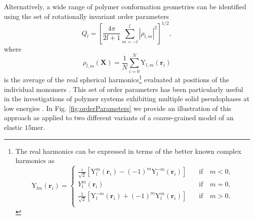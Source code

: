 \documentclass[12pt]{report}
\begin{document}
Alternatively, a wide range of polymer conformation geometries can be identified using the set of rotationally invariant order parameters
%
\begin{equation}
Q_{l} = \left[ \frac{4\pi}{2l + 1} \displaystyle\sum_{m = -l}^{l}
|\rho_{l,m}|^{2} \right]^{1/2},	
\end{equation}
%
where 
\begin{equation}
\rho _{l,m}(\mathbf{X}) = \frac{1}{N}\sum _{i = 0} ^{N} \mathrm{Y}_{l,m}(\mathbf{r}_{i})
\label{eq:15}
\end{equation}
%
is the average of the real spherical harmonics\footnote{The real harmonics can be expressed in terms of the better known complex harmonics as
\begin{equation}
	\mathrm{Y}_{lm}(\mathbf{r}_{i}) =  \left\{
		\begin{array}{lr}
		\frac{i}{\sqrt{2}}\left[\mathrm{Y}_{l}^{m}(\mathbf{r}_{i}) -
(-1)^{m}\mathrm{Y}_{l}^{-m}(\mathbf{r}_{i})\right] & \quad \mathrm{if} \quad  m < 0,
\\[1.5ex]
		{Y}_{l}^{m}(\mathbf{r}_{i}) & \quad \mathrm{if} \quad  m = 0, \\[1.5ex]
		\frac{1}{\sqrt{2}}\left[\mathrm{Y}_{l}^{-m}(\mathbf{r}_{i}) +
(-1)^{m}\mathrm{Y}_{l}^{m}(\mathbf{r}_{i})\right] & \quad \mathrm{if} \quad  m > 0. \\
		\end{array}
	\right. 
\end{equation}
} evaluated at positions of the individual monomers \cite{Neirotti2000}. This set of order parameters has been particularly useful in the investigations of polymer systems exhibiting multiple solid pseudophases at low energies \cite{Koci2016}. In Fig.\,\,\ref{fig:orderParameters} we provide an illustration of this approach as applied to two different variants of a coarse-grained model of an elastic $15$mer. 
\end{document}
